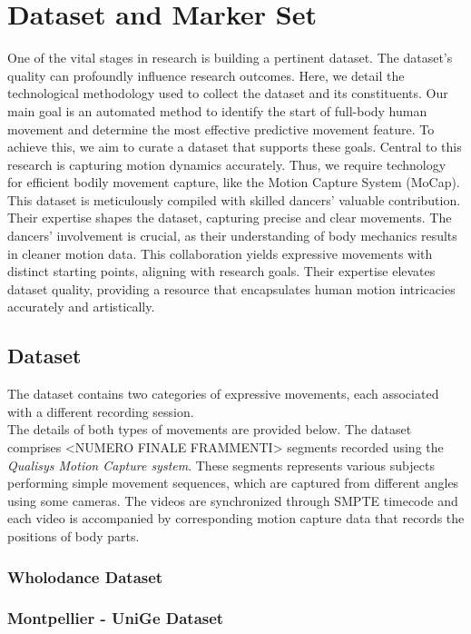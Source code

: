 \section{Dataset and Marker Set}
One of the vital stages in research is building a pertinent dataset.
The dataset's quality can profoundly influence research outcomes. Here, we detail the technological methodology used to collect the dataset and its constituents.
Our main goal is an automated method to identify the start of full-body human movement and determine the most effective predictive movement feature.
To achieve this, we aim to curate a dataset that supports these goals.
Central to this research is capturing motion dynamics accurately.
Thus, we require technology for efficient bodily movement capture, like the Motion Capture System (MoCap).
This dataset is meticulously compiled with skilled dancers' valuable contribution.
Their expertise shapes the dataset, capturing precise and clear movements.
The dancers' involvement is crucial, as their understanding of body mechanics results in cleaner motion data.
This collaboration yields expressive movements with distinct starting points, aligning with research goals.
Their expertise elevates dataset quality, providing a resource that encapsulates human motion intricacies accurately and artistically.


\subsection{Dataset}
The dataset contains two categories of expressive movements, each associated with a different recording session. \\
The details of both types of movements are provided below.
The dataset comprises <NUMERO FINALE FRAMMENTI> segments recorded using the \textit{Qualisys Motion Capture system}.
These segments represents various subjects performing simple movement sequences, which are captured from different angles using some cameras.
The videos are synchronized through SMPTE timecode and each video is accompanied by corresponding motion capture data that records the positions of body parts.


\subsubsection{Wholodance Dataset}
\subsubsection{Montpellier - UniGe Dataset}

